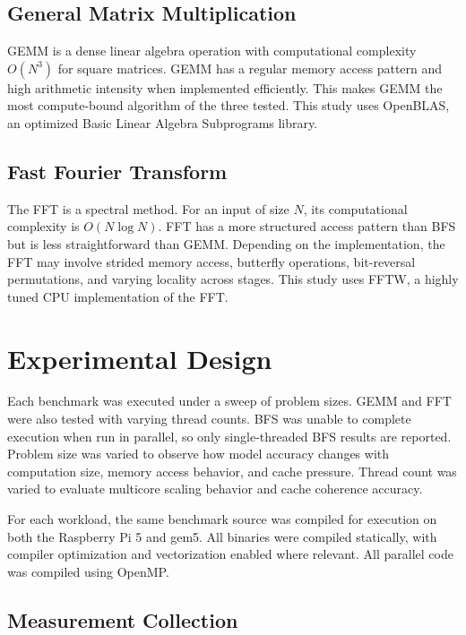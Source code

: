 \documentclass[acmlarge]{acmart}
\begin{document}
\subsection{General Matrix Multiplication}

GEMM is a dense linear algebra operation with computational complexity \(O(N^3)\)
for square matrices. GEMM has a regular memory access pattern and high arithmetic
intensity when implemented efficiently. This makes GEMM the most
compute-bound algorithm of the three tested. This study uses OpenBLAS, an
optimized Basic Linear Algebra Subprograms library.

\subsection{Fast Fourier Transform}

The FFT is a spectral method. For an input of size \(N\), its computational
complexity is \(O(N \log N)\). FFT has a more structured access pattern than BFS
but is less straightforward than GEMM. Depending on the implementation, the FFT
may involve strided memory access, butterfly operations, bit-reversal
permutations, and varying locality across stages. This study uses FFTW, a highly
tuned CPU implementation of the FFT.

\section{Experimental Design}

Each benchmark was executed under a sweep of problem sizes. GEMM and FFT were
also tested with varying thread counts. BFS was unable to complete execution when
run in parallel, so only single-threaded BFS results are reported. Problem size
was varied to observe how model accuracy changes with computation size, memory
access behavior, and cache pressure. Thread count was varied to evaluate
multicore scaling behavior and cache coherence accuracy.

For each workload, the same benchmark source was compiled for execution on both
the Raspberry Pi 5 and gem5. All binaries were compiled statically, with compiler
optimization and vectorization enabled where relevant. All parallel code was
compiled using OpenMP.

\subsection{Measurement Collection}
\end{document}
